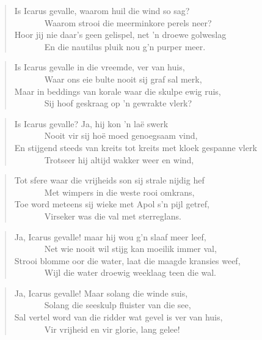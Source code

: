 \begin{verse}
Is Icarus gevalle, waarom huil die wind so sag? \\ 
\ \ \ \ \ \ \ Waarom strooi die meerminkore perels neer? \\ 
Hoor jij nie daar’s geen gelispel, net ’n droewe golweslag \\ 
\ \ \ \ \ \ \ En die nautilus pluik nou g’n purper meer.
\end{verse}

\begin{verse}
Is Icarus gevalle in die vreemde, ver van huis, \\ 
\ \ \ \ \ \ \ Waar ons eie bulte nooit sij graf sal merk, \\ 
Maar in beddings van korale waar die skulpe ewig ruis, \\ 
\ \ \ \ \ \ \ Sij hoof geskraag op ’n gewrakte vlerk?
\end{verse}

\begin{verse}
Is Icarus gevalle? Ja, hij kon ’n la\"e swerk \\ 
\ \ \ \ \ \ \ Nooit vir sij ho\"e moed genoegsaam vind, \\ 
En stijgend steeds van kreits tot kreits met kloek gespanne vlerk \\ 
\ \ \ \ \ \ \ Trotseer hij altijd wakker weer en wind,
\end{verse}

\begin{verse}
Tot sfere waar die vrijheids son sij strale nijdig hef \\ 
\ \ \ \ \ \ \ Met wimpers in die weste rooi omkrans, \\ 
Toe word meteens sij wieke met Apol s’n pijl getref, \\ 
\ \ \ \ \ \ \ Virseker was die val met sterreglans.
\end{verse}

\begin{verse}
Ja, Icarus gevalle! maar hij wou g’n slaaf meer leef, \\ 
\ \ \ \ \ \ \ Net wie nooit wil stijg kan moeilik immer val, \\ 
Strooi blomme oor die water, laat die maagde kransies weef, \\ 
\ \ \ \ \ \ \ Wijl die water droewig weeklaag teen die wal.
\end{verse}

\begin{verse}
Ja, Icarus gevalle! Maar solang die winde suis, \\ 
\ \ \ \ \ \ \ Solang die seeskulp fluister van die see, \\ 
Sal vertel word van die ridder wat gevel is ver van huis, \\ 
\ \ \ \ \ \ \ Vir vrijheid en vir glorie, lang gelee!
\end{verse}